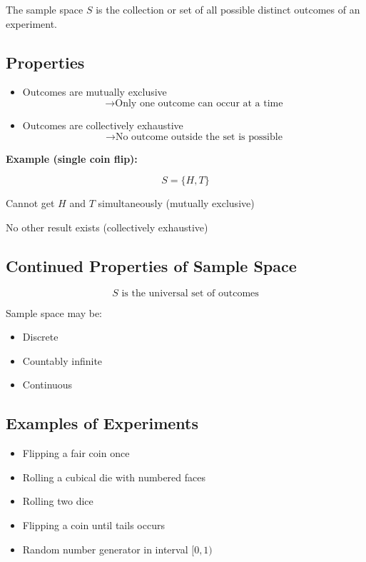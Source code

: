 \documentclass[12pt]{article}
\begin{document}
The sample space $S$ is the collection or set of all possible distinct outcomes of an experiment.

\subsection*{Properties}

\begin{itemize}
\item Outcomes are mutually exclusive  
\[
\rightarrow \text{Only one outcome can occur at a time}
\]

\item Outcomes are collectively exhaustive  
\[
\rightarrow \text{No outcome outside the set is possible}
\]
\end{itemize}

\textbf{Example (single coin flip):}

\[
S = \{H,T\}
\]

Cannot get $H$ and $T$ simultaneously (mutually exclusive)

No other result exists (collectively exhaustive)

\subsection*{Continued Properties of Sample Space}

\[
S \text{ is the universal set of outcomes}
\]

Sample space may be:

\begin{itemize}
\item Discrete
\item Countably infinite
\item Continuous
\end{itemize}

\subsection*{Examples of Experiments}

\begin{itemize}
\item Flipping a fair coin once
\item Rolling a cubical die with numbered faces
\item Rolling two dice
\item Flipping a coin until tails occurs
\item Random number generator in interval $[0,1)$
\end{itemize}
\end{document}
